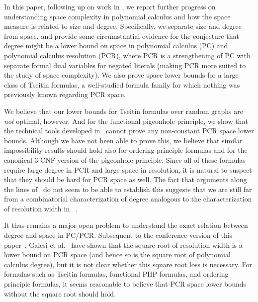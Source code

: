 \documentclass[11pt]{article}
\makeatletter
\numberwithin{equation}{section}
\theoremstyle{definition}
\theoremstyle{plain}
\theoremstyle{plain}
\theoremstyle{definition}
\newcommand{\etal}{et al.\@\xspace}
\makeatother
\begin{document}
In this paper, following up on 
%
work in
\cite{BNT13SomeTradeoffs,BG15Framework,FLNRT15SpaceCplx,HN12VirtueSuccinctProofs},
we report further progress on understanding space complexity in
polynomial calculus and how the space measure is related to size and degree.
Specifically, we separate size and degree from
space, and provide some circumstantial evidence for the conjecture
that degree might be a lower bound on space in 
%
polynomial calculus (PC) and polynomial calculus resolution (PCR),
where PCR is a strengthening of PC with separate formal dual variables
for negated literals (making PCR more suited to the
study of space complexity).
We also prove space lower bounds for a large class of Tseitin
formulas, a well-studied formula family for which nothing was
previously known regarding PCR space.

We 
%
believe that our lower bounds for Tseitin formulas
over random graphs are \emph{not} optimal, however. And for the
functional pigeonhole principle, we show that the technical tools
developed in~%
\cite{BG15Framework}
cannot prove any non-constant PCR space lower bounds. Although we have
not been able to prove this, we believe that similar impossibility
results should hold also for ordering principle formulas and for the
canonical \mbox{$3$-CNF} version of the pigeonhole principle.
Since all of these formulas require large degree in PCR
and large space in resolution, it is natural to suspect that
they should be hard for PCR space as well.
The fact that arguments along the lines of~%
\cite{BG15Framework}
do not seem to be able to establish this suggests that we are still
far from a combinatorial characterization of degree analogous to
the characterization of resolution width 
in~%
\cite{AD08CombinatoricalCharacterization}.

It thus remains a major open problem to understand the exact
relation between degree and space in PC/PCR.
Subsequent to the conference version of this
paper~\cite{conf-version}, %
Galesi \etal~\cite{GKT19SpaceWidth} have shown that
%
%
%
the square root of resolution width %
is a lower bound on PCR space %
(and hence so is the square root of polynomial calculus degree), %
but it is not clear whether this square root loss is necessary.
For formulas such as Tseitin formulas, functional PHP formulas, and
ordering principle formulas, it seems reasonable to believe that PCR space
lower bounds without the square root should hold.
\end{document}
